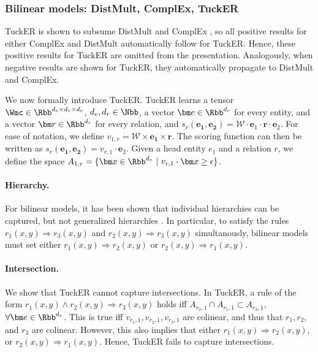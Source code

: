 \documentclass{article}
\begin{document}
\subsubsection{Bilinear models: DistMult, ComplEx, TuckER}

TuckER is shown to subsume DistMult and ComplEx \cite{TuckER}, so all positive results for either ComplEx and DistMult automatically follow for TuckER.  Hence, these positive results for TuckER are omitted from the presentation. Analogously, when negative results are shown for TuckER, they automatically propagate to DistMult and ComplEx. 

We now formally introduce TuckER. TuckER learns a tensor ${\Wmc \in \Rbb^{d_e\times d_r \times d_e}}$,  $d_e,d_r \in \Nbb$, a vector $\bm  e \in \Rbb^{d_e}$ for every entity, and a vector ${\bm r \in \Rbb^{d_r}}$ for every relation, and ${s_r(\bm {e_1}, \bm{e_2}) = \mathcal W \cdot \bm  e_1 \cdot \bm r \cdot\bm  e_2}$. For ease of notation, we define ${v_{1,r} = \mathcal W \times \bm{e_1} \times \bm r}$. The scoring function can then be written as $s_r(\bm {e_1}, \bm{e_2}) = v_{r,1} \cdot \bm  e_2$. Given a head entity $e_1$ and a relation $r$, we define the space ${A_{1,r} = \{ \bm x  \in \Rbb^{d_e} \ | \ v_{r,1} \cdot \bm x \geq \epsilon \}}$. 


\paragraph{Hierarchy.} For bilinear models, it has been shown that individual hierarchies can be captured, but not generalized hierarchies \cite{Gutirrez18}. In particular, to satisfy the rules ${r_1(x,y) \Rightarrow r_3(x,y)}$ and ${r_2(x,y) \Rightarrow r_3(x,y)}$ simultanously, bilinear models must set either ${r_1(x,y) \Rightarrow r_2(x,y)}$ or ${r_2(x,y) \Rightarrow r_1(x,y)}$.

\paragraph{Intersection.} We show that TuckER cannot capture intersections. In TuckER, a rule of the form ${r_1(x, y) \land r_2(x, y) \Rightarrow r_3(x, y)}$ holds iff ${A_{r_2,1} \cap A_{r_1,1} \subset A_{r_3,1}}$, ${\forall \bm e \in \Rbb^{d_e}}$. This is true iff $v_{r_1,1}, v_{r_2,1}, v_{r_3,1}$ are colinear, and thus that $r_1, r_2$, and $r_3$ are colinear. However, this also implies that either $r_1(x,y) \Rightarrow r_2(x,y)$, or $r_2(x,y) \Rightarrow r_1(x,y)$. Hence, TuckER fails to capture intersections. 
\end{document}
